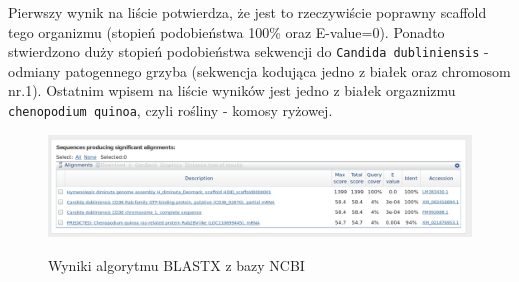 \documentclass[a4paper]{article}
\begin{document}
Pierwszy wynik na liście potwierdza, że jest to rzeczywiście poprawny scaffold tego organizmu
(stopień podobieństwa 100\% oraz E-value=0). Ponadto stwierdzono duży stopień podobieństwa sekwencji do \texttt{Candida dubliniensis} - odmiany
patogennego grzyba (sekwencja kodująca jedno z białek oraz chromosom nr.1). Ostatnim wpisem na liście wyników jest jedno z białek orgaznizmu
\texttt{chenopodium quinoa}, czyli rośliny - komosy ryżowej. 

\begin{figure}[h]
    \centering
    \includegraphics[width=1.0\textwidth]{result.png}
    \label{fig:result}
    \caption[]{Wyniki algorytmu BLASTX z bazy NCBI}
\end{figure}
\end{document}
